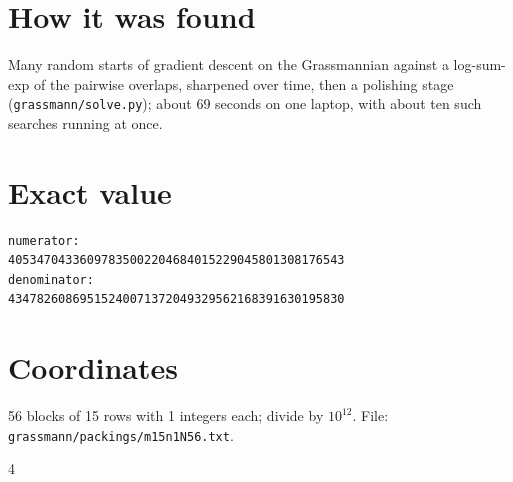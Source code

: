 \documentclass[11pt,a4paper]{article}
\begin{document}
\section{How it was found}
Many random starts of gradient descent on the Grassmannian against a log-sum-exp of the pairwise overlaps, sharpened over time, then a polishing stage (\texttt{grassmann/solve.py}); about 69 seconds on one laptop, with about ten such searches running at once.


\appendix
\section{Exact value}
{\small
\begin{verbatim}
numerator:
40534704336097835002204684015229045801308176543
denominator:
43478260869515240071372049329562168391630195830
\end{verbatim}}

\section{Coordinates}
56 blocks of 15 rows with 1 integers each; divide by $10^{12}$. File: \texttt{grassmann/packings/m15n1N56.txt}.
{\tiny
\begin{multicols}{4}
\end{multicols}}
\end{document}
